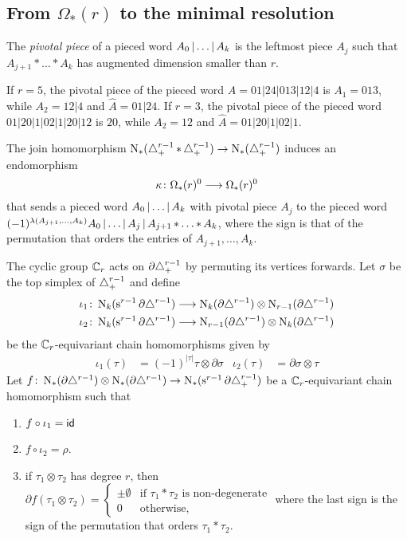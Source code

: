 
\subsection{From $\Omega_*(r)$ to the minimal resolution}\label{ss:mapf} The \emph{pivotal piece} of a pieced word $A_0\operatorname{|} \ldots\operatorname{|} A_k$ is the leftmost piece $A_j$ such that $A_{j+1}*\ldots*A_k$ has augmented dimension smaller than $r$.

\begin{example}
	If $r=5$, the pivotal piece of the pieced word $A=01|24|013|12|4$ is $A_1 = 013$, while $A_2 = 12|4$ and $\hat{A} = 01|24$. If $r=3$, the pivotal piece of the pieced word $01|20|1|02|1|20|12$ is $20$, while $A_2 = 12$ and $\hat{A} = 01|20|1|02|1$.
\end{example}

The join homomorphism $\operatorname{N}_*(\triangle_{+}^{r-1}\operatorname{\ast} \triangle_{+}^{r-1})\to \operatorname{N}_*(\triangle_{+}^{r-1})$ induces an endomorphism
\[
\kappa\colon \Omega_*(r)^0\longrightarrow \Omega_*(r)^0
\]
that sends a pieced word $A_0\operatorname{|} \ldots\operatorname{|} A_k$ with pivotal piece $A_j$ to the pieced word $(-1)^{\lambda(A_{j+1},\ldots,A_k)}A_0\operatorname{|} \ldots\operatorname{|} A_j\operatorname{|} A_{j+1}\operatorname{\ast}\ldots\operatorname{\ast} A_k$, where the sign is that of the permutation that orders the entries of $A_{j+1},\ldots,A_k$.

The cyclic group $\mathbb{C}_r$ acts on $\partial \triangle_{+}^{r-1}$ by permuting its vertices forwards. Let $\sigma$ be the top simplex of $\triangle_{+}^{r-1}$ and define
\begin{align*}
	\iota_1\colon \operatorname{N}_k(\operatorname{s}^{r-1}\partial \triangle^{r-1})&\longrightarrow \operatorname{N}_{k}(\partial\triangle^{r-1})\otimes \operatorname{N}_{r-1}(\partial\triangle^{r-1})\\
	\iota_2\colon \operatorname{N}_k(\operatorname{s}^{r-1}\partial \triangle^{r-1})&\longrightarrow \operatorname{N}_{r-1}(\partial\triangle^{r-1})\otimes \operatorname{N}_{k}(\partial\triangle^{r-1})
\end{align*}
be the $\mathbb{C}_r$-equivariant chain homomorphisms given by
\begin{align*}
	\iota_1(\tau) &= (-1)^{|\tau|}\tau\otimes \partial \sigma &
	\iota_2(\tau) &= \partial \sigma\otimes \tau
\end{align*}
Let $f\colon \operatorname{N}_*(\partial\triangle^{r-1})\otimes\operatorname{N}_*(\partial\triangle^{r-1})\to \operatorname{N}_*(\operatorname{s}^{r-1}\partial\triangle_{+}^{r-1})$ be a $\mathbb{C}_r$-equivariant chain homomorphism such that
\renewcommand{\theenumi}{\roman{enumi}}
\begin{enumerate}
	\item\label{cond:1} $f\circ \iota_1 = \mathsf{id}$
	\item\label{cond:2} $f\circ \iota_2 = \rho$.
	\item\label{cond:3} if $\tau_1\otimes\tau_2$ has degree $r$, then $ \partial f(\tau_1\otimes\tau_2) =
	\begin{cases}
		\pm\emptyset & \text{if $\tau_1* \tau_2$ is non-degenerate} \\
		0 & \text{otherwise},
	\end{cases}$
	where the last sign is the sign of the permutation that orders $\tau_1*\tau_2$.
\end{enumerate}

